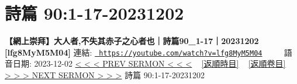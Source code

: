\documentclass{book}
\begin{document}
\section{詩篇 90:1-17-20231202}
\label{sec:lfg8MyM5M04}
\textbf{【網上崇拜】大人者,不失其赤子之心者也｜詩篇90\_1-17｜20231202 [lfg8MyM5M04]}
\newline
\newline
連結: \href{https://youtube.com/watch?v=lfg8MyM5M04}{\texttt{ https://youtube.com/watch?v=lfg8MyM5M04}} ~~~~ 語音日期: 2023-12-02 
\newline
\newline
\hyperref[sec:w1NzLUX2_GE]{\small{< < < PREV SERMON < < <}}
~
\hyperref[sec:index_chronic]{\small{[返順時目]}}
~
\hyperref[sec:index_scriptual]{\small{[返順卷目]}}
~
\hyperref[sec:0oiGMpkgXB8]{\small{> > > NEXT SERMON > > >}}
\newline
\newline
詩篇 90:1-17-20231202
\newline
\end{document}
